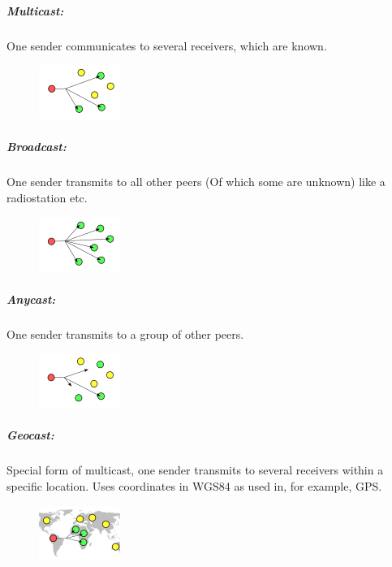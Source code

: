 \documentclass[a4paper,12pt]{article}
\begin{document}
    \subparagraph{Multicast:} 
    One sender communicates to several receivers, which are known.
    \begin{figure}[h!]
        \includegraphics[width=0.3\linewidth]{Multicast.png}
    \end{figure}

    \subparagraph{Broadcast:} 
    One sender transmits to all other peers (Of which some are unknown) like a radiostation etc. 
    \begin{figure}[h!]
        \includegraphics[width=0.3\linewidth]{Broadcast.png}
    \end{figure}

    \newpage
    \subparagraph{Anycast:} 
    One sender transmits to a group of other peers.
    \begin{figure}[h!]
        \includegraphics[width=0.3\linewidth]{Anycast.png}
    \end{figure}

    \subparagraph{Geocast:} 
    Special form of multicast, one sender transmits to several receivers within a specific location.
    Uses coordinates in WGS84 as used in, for example, GPS.
    \begin{figure}[h!]
        \includegraphics[width=0.3\linewidth]{Geocast.png}
    \end{figure}
\end{document}
